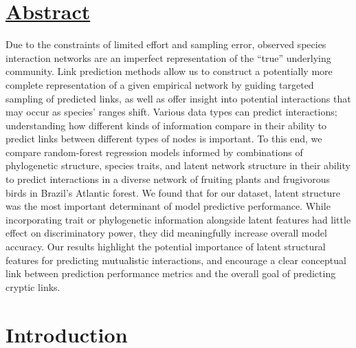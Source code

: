 \section*{\textbf{\underline{Abstract}}}
Due to the constraints of limited effort and sampling error, observed species interaction networks are an imperfect representation of the ``true'' underlying community. Link prediction methods allow us to construct a potentially more complete representation of a given empirical network by guiding targeted sampling of predicted links, as well as offer insight into potential interactions that may occur as species' ranges shift. Various data types can predict interactions; understanding how different kinds of information compare in their ability to predict links between different types of nodes is important. To this end, we compare random-forest regression models informed by combinations of phylogenetic structure, species traits, and latent network structure in their ability to predict interactions in a diverse network of fruiting plants and frugivorous birds in Brazil's Atlantic forest. We found that for our dataset, latent structure was the most important determinant of model predictive performance. While incorporating trait or phylogenetic information alongside latent features had little effect on discriminatory power, they did meaningfully increase overall model accuracy. Our results highlight the potential importance of latent structural features for predicting mutualistic interactions, and encourage a clear conceptual link between prediction performance metrics and the overall goal of predicting cryptic links.

\section*{Introduction}
